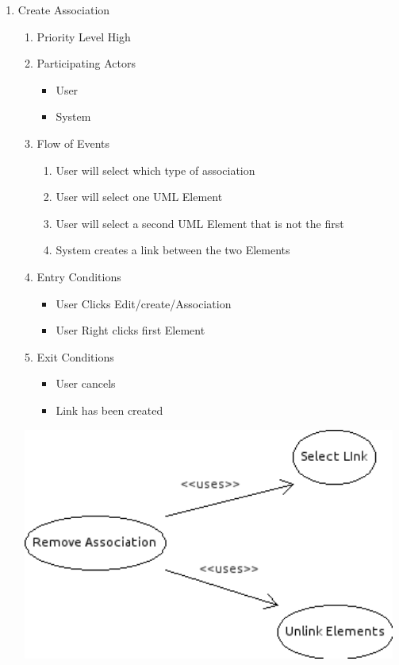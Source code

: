 \documentclass[a4paper, 12pt]{article}
\begin{document}
\begin{enumerate}
\item Create Association
  \begin {enumerate}
  \item Priority Level High
  \item Participating Actors
    \begin {itemize}
    \item User
    \item System
    \end {itemize}
  \item Flow of Events
    \begin {enumerate}
    \item User will select which type of association
    \item User will select one UML Element
    \item User will select a second UML Element that is not the first
    \item System creates a link between the two Elements
    \end {enumerate}
  \item Entry Conditions
    \begin {itemize}
    \item User Clicks Edit/create/Association
    \item User Right clicks first Element
    \end {itemize}
  \item Exit Conditions
    \begin {itemize}
    \item User cancels
    \item Link has been created
    \end {itemize}
  \end {enumerate}

  \begin {center}
    \includegraphics[width=5in, height=3in] {img/RemoveAssociation.png}
  \end {center}


\end{enumerate}
\end{document}
